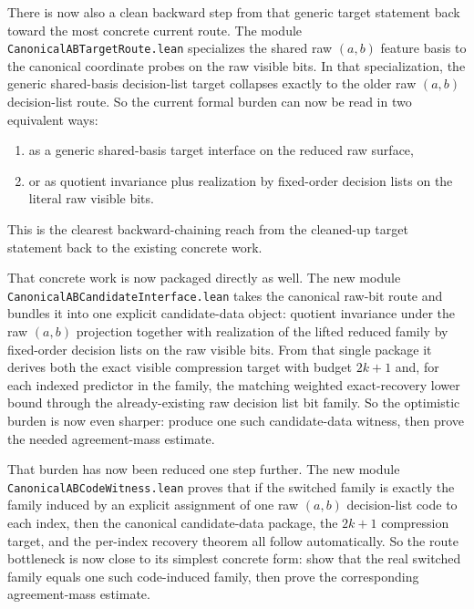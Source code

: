 \documentclass[11pt]{article}
\theoremstyle{remark}
\begin{document}
There is now also a clean backward step from that generic target statement back
toward the most concrete current route.  The module
\texttt{CanonicalABTargetRoute.lean} specializes the shared raw \((a,b)\)
feature basis to the canonical coordinate probes on the raw visible bits.  In
that specialization, the generic shared-basis decision-list target collapses
exactly to the older raw \((a,b)\) decision-list route.  So the current formal
burden can now be read in two equivalent ways:
\begin{enumerate}[leftmargin=1.5em]
  \item as a generic shared-basis target interface on the reduced raw surface,
  \item or as quotient invariance plus realization by fixed-order decision
  lists on the literal raw visible bits.
\end{enumerate}
This is the clearest backward-chaining reach from the cleaned-up target
statement back to the existing concrete work.

That concrete work is now packaged directly as well.  The new module
\texttt{CanonicalABCandidateInterface.lean} takes the canonical raw-bit route
and bundles it into one explicit candidate-data object: quotient invariance
under the raw \((a,b)\) projection together with realization of the lifted
reduced family by fixed-order decision lists on the raw visible bits.  From
that single package it derives both the exact visible compression target with
budget \(2k+1\) and, for each indexed predictor in the family, the matching
weighted exact-recovery lower bound through the already-existing raw decision
list bit family.  So the optimistic burden is now even sharper: produce one
such candidate-data witness, then prove the needed agreement-mass estimate.

That burden has now been reduced one step further.  The new module
\texttt{CanonicalABCodeWitness.lean} proves that if the switched family is
exactly the family induced by an explicit assignment of one raw \((a,b)\)
decision-list code to each index, then the canonical candidate-data package,
the \(2k+1\) compression target, and the per-index recovery theorem all follow
automatically.  So the route bottleneck is now close to its simplest concrete
form: show that the real switched family equals one such code-induced family,
then prove the corresponding agreement-mass estimate.
\end{document}

